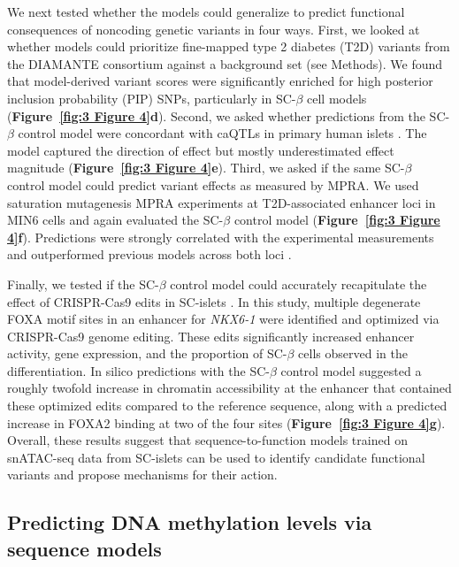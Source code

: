 We next tested whether the models could generalize to predict functional consequences of noncoding genetic variants in four ways. First, we looked at whether models could prioritize fine-mapped type 2 diabetes (T2D) variants from the DIAMANTE consortium \cite{Mahajan2022-hu} against a background set (see Methods). We found that model-derived variant scores were significantly enriched for high posterior inclusion probability (PIP) SNPs, particularly in SC-$\beta$ cell models (\textbf{Figure~\ref{fig:3 Figure 4}\textbf{d}}). Second, we asked whether predictions from the SC-$\beta$ control model were concordant with caQTLs in primary human islets \cite{Mummey2024-kx}. The model captured the direction of effect but mostly underestimated effect magnitude (\textbf{Figure~\ref{fig:3 Figure 4}\textbf{e}}). Third, we asked if the same SC-$\beta$ control model could predict variant effects as measured by MPRA. We used saturation mutagenesis MPRA experiments at T2D-associated enhancer loci in MIN6 cells and again evaluated the SC-$\beta$ control model \cite{Kircher2019-di} (\textbf{Figure~\ref{fig:3 Figure 4}\textbf{f}}). Predictions were strongly correlated with the experimental measurements and outperformed previous models across both loci \cite{Hudaiberdiev2023-ew}.

Finally, we tested if the SC-$\beta$ control model could accurately recapitulate the effect of CRISPR-Cas9 edits in SC-islets \cite{Geusz2021-mr}. In this study, multiple degenerate FOXA motif sites in an enhancer for \textit{NKX6-1} were identified and optimized via CRISPR-Cas9 genome editing. These edits significantly increased enhancer activity, gene expression, and the proportion of SC-$\beta$ cells observed in the differentiation. In silico predictions with the SC-$\beta$ control model suggested a roughly twofold increase in chromatin accessibility at the enhancer that contained these optimized edits compared to the reference sequence, along with a predicted increase in FOXA2 binding at two of the four sites (\textbf{Figure~\ref{fig:3 Figure 4}\textbf{g}}). Overall, these results suggest that sequence-to-function models trained on snATAC-seq data from SC-islets can be used to identify candidate functional variants and propose mechanisms for their action.

\subsection{Predicting DNA methylation levels via sequence models}

